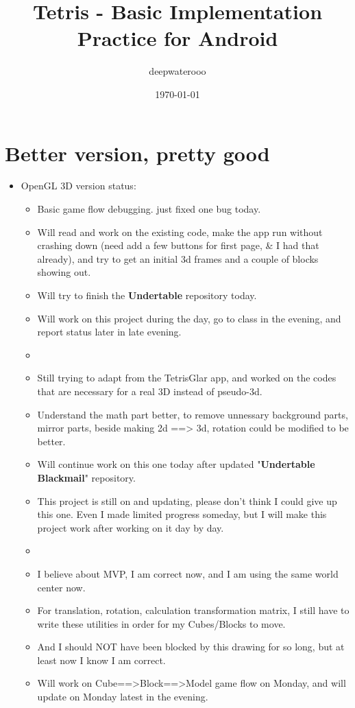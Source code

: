 \documentclass[9pt,b5paper]{article}
\author{deepwaterooo}
\date{\today}
\title{Tetris - Basic Implementation Practice for Android}
\begin{document}
\maketitle
\tableofcontents


\section{Better version, pretty good}
\label{sec-1}
\begin{itemize}
\item OpenGL 3D version status: 
\begin{itemize}
\item Basic game flow debugging. just fixed one bug today.
\item Will read and work on the existing code, make the app run without crashing down (need add a few buttons for first page, \& I had that already), and try to get an initial 3d frames and a couple of blocks showing out.
\item Will try to finish the \textbf{Undertable} repository today.
\item Will work on this project during the day, go to class in the evening, and report status later in late evening.
\item 
\item Still trying to adapt from the TetrisGlar app, and worked on the codes that are necessary for a real 3D instead of pseudo-3d.
\item Understand the math part better, to remove unnessary background parts, mirror parts, beside making 2d ==> 3d, rotation could be modified to be better.
\item Will continue work on this one today after updated "\textbf{Undertable Blackmail}" repository.
\item This project is still on and updating, please don't think I could give up this one. Even I made limited progress someday, but I will make this project work after working on it day by day.
\item 
\item I believe about MVP, I am correct now, and I am using the same world center now.
\item For translation, rotation, calculation transformation matrix, I still have to write these utilities in order for my Cubes/Blocks to move.
\item And I should NOT have been blocked by this drawing for so long, but at least now I know I am correct.
\item Will work on Cube==>Block==>Model game flow on Monday, and will update on Monday latest in the evening.

\end{itemize}
\end{itemize}
\end{document}
